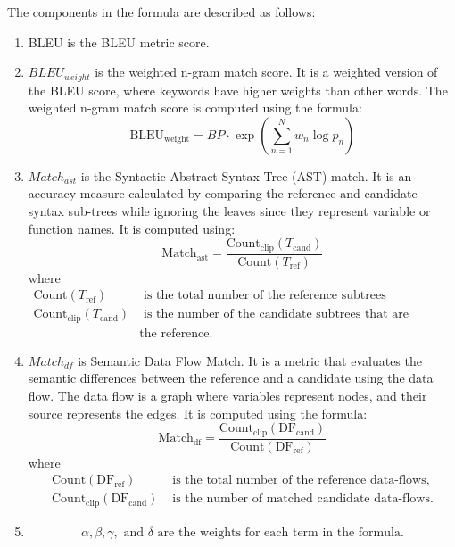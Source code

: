 The components in the formula are described as follows:
\begin{enumerate}
\item BLEU is the BLEU metric score.
\item $BLEU_{weight}$ is the weighted n-gram match score. It is a weighted version of the BLEU score, where keywords have higher weights than other words. The weighted n-gram match score is computed using the formula:
\begin{equation}
\text{BLEU}_{\text{weight}} = BP \cdot \exp\left( \sum_{n=1}^{N} w_n \log p_n \right)
\end{equation}
\item $Match_{ast}$ is the Syntactic Abstract Syntax Tree (AST) match. It is an accuracy measure calculated by comparing the reference and candidate syntax sub-trees while ignoring the leaves since they represent variable or function names. It is computed using:
\begin{equation}
\text{Match}_{\text{ast}} = \frac{\text{Count}_{\text{clip}}(T_{\text{cand}})}{\text{Count}(T_{\text{ref}})}
\end{equation}
where
\begin{align*}
\text{Count}(T_{\text{ref}}) &\text{ is the total number of the reference subtrees} \\
\text{Count}_{\text{clip}}(T_{\text{cand}}) &\text{ is the number of the candidate subtrees that are matched with} \\
&\text{the reference.}
\end{align*}

\item $Match_{df}$ is Semantic Data Flow Match. It is a metric that evaluates the semantic differences between the reference and a candidate using the data flow. The data flow is a graph where variables represent nodes, and their source represents the edges. It is computed using the formula:
\begin{equation}
\text{Match}_{\text{df}} = \frac{\text{Count}_{\text{clip}}(\text{DF}_{\text{cand}})}{\text{Count}(\text{DF}_{\text{ref}})}
\end{equation}
where
\begin{align*}
\text{Count}(\text{DF}_{\text{ref}}) &\text{ is the total number of the reference data-flows,} \\
\text{Count}_{\text{clip}}(\text{DF}_{\text{cand}}) &\text{ is the number of matched candidate data-flows.}
\end{align*}

\item \[
\alpha, \beta, \gamma, \text{ and } \delta \text{ are the weights for each term in the formula.}
\]
\end{enumerate}



